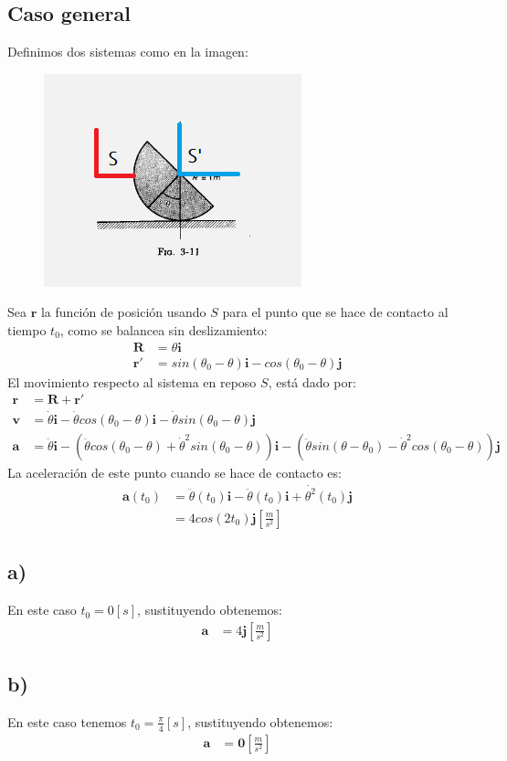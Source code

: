 \documentclass{article}
\begin{document}
\begin{tcolorbox}[breakable]
    \subsection*{Caso general}
    Definimos dos sistemas como en la imagen:
    \begin{figure}[H]
        \centering 
        \includegraphics[trim=30 30 30 30, clip]{p5_cylinder.png}
    \end{figure}
    Sea $\bm{r}$ la función de posición usando $S$ para el punto que se hace de contacto al tiempo $t_0$,
    como se balancea sin deslizamiento:
    \begin{align*}
        \bm{R} &= \theta \bm{i} \\
        \bm{r'} &= sin(\theta_0-\theta)\bm{i} - cos(\theta_0-\theta)\bm{j}
    \end{align*}
    El movimiento respecto al sistema en reposo $S$, está dado por:
    \begin{align*}
        \bm{r} &= \bm{R} + \bm{r'} \\
        \bm{v} &=\dot{\theta}\bm{i} 
        - \dot{\theta}cos(\theta_0-\theta)\bm{i} 
        - \dot{\theta}sin(\theta_0-\theta)\bm{j} \\ 
        \bm{a} 
        &=\ddot{\theta}\bm{i} 
        -(\ddot{\theta}cos(\theta_0-\theta) + \dot{\theta}^2sin(\theta_0-\theta))\bm{i} 
        -(\ddot{\theta}sin(\theta-\theta_0) - \dot{\theta}^2cos(\theta_0-\theta))\bm{j}  
    \end{align*}
    La aceleración de este punto cuando se hace de contacto es:
    \begin{align*}
        \bm{a}(t_0) 
        &= \ddot{\theta}(t_0)\bm{i} - \ddot{\theta}(t_0)\bm{i} + \dot{\theta^2}(t_0)\bm{j} \\
        &= 4cos(2t_0)\bm{j} \left[ \frac{m}{s^2} \right]
    \end{align*}
    \subsection*{a)}
    En este caso $t_0 = 0[s]$, sustituyendo obtenemos:
    \begin{align*}
        \bm{a} &= 4\bm{j} \left[ \frac{m}{s^2} \right]
    \end{align*}
    \subsection*{b)}
    En este caso tenemos $t_0 = \frac{\pi}{4}[s]$, sustituyendo obtenemos:
    \begin{align*}
        \bm{a} &= \bm{0} \left[ \frac{m}{s^2} \right]
    \end{align*}
\end{tcolorbox}
\end{document}

